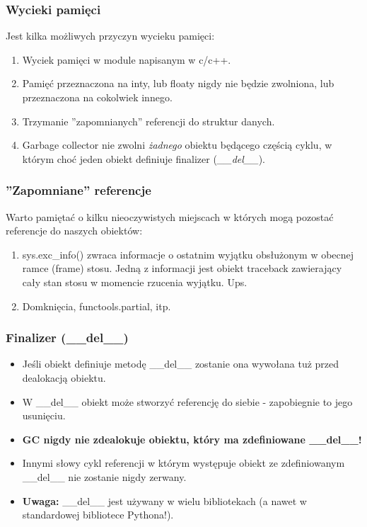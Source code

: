 \documentclass{beamer}
\begin{document}
    \begin{frame}
        \frametitle{Wycieki pamięci}
        Jest kilka możliwych przyczyn wycieku pamięci:
        \begin{enumerate}
            \item Wyciek pamięci w module napisanym w c/c++.
            \item Pamięć przeznaczona na inty, lub floaty nigdy nie będzie zwolniona, lub przeznaczona na cokolwiek innego.
            \item Trzymanie ''zapomnianych'' referencji do struktur danych.
            \item Garbage collector nie zwolni \textit{żadnego} obiektu będącego częścią cyklu, w którym choć jeden obiekt definiuje finalizer (\textit{\_\_del\_\_}).
        \end{enumerate}
    \end{frame}

    \begin{frame}
        \frametitle{''Zapomniane'' referencje}
        Warto pamiętać o kilku nieoczywistych miejscach w których mogą pozostać referencje do naszych obiektów:
        \begin{enumerate}
            \item sys.exc\_info() zwraca informacje o ostatnim wyjątku obsłużonym w obecnej ramce (frame) stosu. Jedną z informacji jest obiekt traceback zawierający cały stan stosu w momencie rzucenia wyjątku. Ups.
            \item Domknięcia, functools.partial, itp.
        \end{enumerate}
    \end{frame}

    \begin{frame}
        \frametitle{Finalizer (\_\_del\_\_)}
        \begin{itemize}
            \item Jeśli obiekt definiuje metodę \_\_del\_\_ zostanie ona wywołana tuż przed dealokacją obiektu.
            \item W \_\_del\_\_ obiekt może stworzyć referencję do siebie - zapobiegnie to jego usunięciu.
            \item \textbf{GC nigdy nie zdealokuje obiektu, który ma zdefiniowane \_\_del\_\_!}
            \item Innymi słowy cykl referencji w którym występuje obiekt ze zdefiniowanym \_\_del\_\_ nie zostanie nigdy zerwany.
            \item \textbf{Uwaga:} \_\_del\_\_ jest używany w wielu bibliotekach (a nawet w standardowej bibliotece Pythona!).
        \end{itemize}
    \end{frame}
\end{document}
